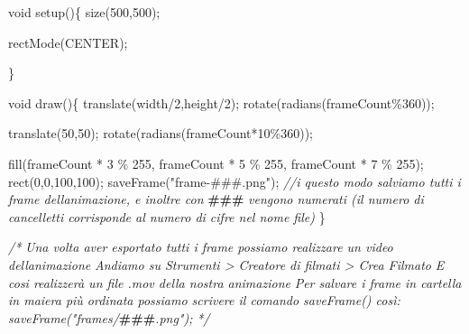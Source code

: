 \documentclass[
]{article}
\newenvironment{Shaded}{}{}
\newcommand{\AlertTok}[1]{\textcolor[rgb]{1.00,0.00,0.00}{\textbf{#1}}}
\newcommand{\CommentTok}[1]{\textcolor[rgb]{0.38,0.63,0.69}{\textit{#1}}}
\newcommand{\DataTypeTok}[1]{\textcolor[rgb]{0.56,0.13,0.00}{#1}}
\newcommand{\DecValTok}[1]{\textcolor[rgb]{0.25,0.63,0.44}{#1}}
\newcommand{\FunctionTok}[1]{\textcolor[rgb]{0.02,0.16,0.49}{#1}}
\newcommand{\NormalTok}[1]{#1}
\newcommand{\OperatorTok}[1]{\textcolor[rgb]{0.40,0.40,0.40}{#1}}
\newcommand{\StringTok}[1]{\textcolor[rgb]{0.25,0.44,0.63}{#1}}
\begin{document}
\begin{Shaded}
\begin{Highlighting}[]
\DataTypeTok{void} \FunctionTok{setup}\OperatorTok{()\{}
  \FunctionTok{size}\OperatorTok{(}\DecValTok{500}\OperatorTok{,}\DecValTok{500}\OperatorTok{);}
 
  \FunctionTok{rectMode}\OperatorTok{(}\NormalTok{CENTER}\OperatorTok{);}
  
\OperatorTok{\}}

\DataTypeTok{void} \FunctionTok{draw}\OperatorTok{()\{}
  \FunctionTok{translate}\OperatorTok{(}\NormalTok{width}\OperatorTok{/}\DecValTok{2}\OperatorTok{,}\NormalTok{height}\OperatorTok{/}\DecValTok{2}\OperatorTok{);}
  \FunctionTok{rotate}\OperatorTok{(}\FunctionTok{radians}\OperatorTok{(}\NormalTok{frameCount}\OperatorTok{\%}\DecValTok{360}\OperatorTok{));}
  
  \FunctionTok{translate}\OperatorTok{(}\DecValTok{50}\OperatorTok{,}\DecValTok{50}\OperatorTok{);}
  \FunctionTok{rotate}\OperatorTok{(}\FunctionTok{radians}\OperatorTok{(}\NormalTok{frameCount}\OperatorTok{*}\DecValTok{10}\OperatorTok{\%}\DecValTok{360}\OperatorTok{));}
  
  \FunctionTok{fill}\OperatorTok{(}\NormalTok{frameCount }\OperatorTok{*} \DecValTok{3} \OperatorTok{\%} \DecValTok{255}\OperatorTok{,}\NormalTok{ frameCount }\OperatorTok{*} \DecValTok{5} \OperatorTok{\%} \DecValTok{255}\OperatorTok{,}
\NormalTok{      frameCount }\OperatorTok{*} \DecValTok{7} \OperatorTok{\%} \DecValTok{255}\OperatorTok{);}
  \FunctionTok{rect}\OperatorTok{(}\DecValTok{0}\OperatorTok{,}\DecValTok{0}\OperatorTok{,}\DecValTok{100}\OperatorTok{,}\DecValTok{100}\OperatorTok{);}
  \FunctionTok{saveFrame}\OperatorTok{(}\StringTok{"frame{-}\#\#\#.png"}\OperatorTok{);} \CommentTok{//i questo modo salviamo tutti i frame dell\textquotesingle{}animazione, e inoltre con }\AlertTok{\#\#\#}\CommentTok{ vengono numerati (il numero di cancelletti corrisponde al numero di cifre nel nome file)}
\OperatorTok{\}}

\CommentTok{/*}
\CommentTok{Una volta aver esportato tutti i frame possiamo realizzare un video dell\textquotesingle{}animazione}
\CommentTok{Andiamo su Strumenti \textgreater{} Creatore di filmati \textgreater{} Crea Filmato}
\CommentTok{E cosi realizzerà un file .mov della nostra animazione}
\CommentTok{Per salvare i frame in cartella in maiera più ordinata possiamo scrivere il comando saveFrame() così:}
\CommentTok{saveFrame("frames/}\AlertTok{\#\#\#}\CommentTok{.png");}
\CommentTok{*/}
\end{Highlighting}
\end{Shaded}
\end{document}

